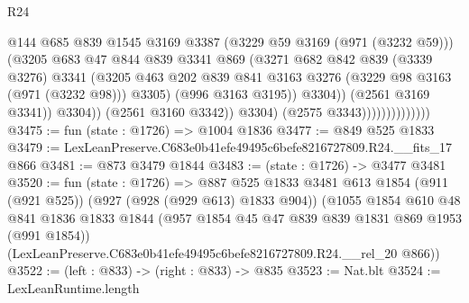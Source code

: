 \begin{lexlean}{R24}
\begin{coremodule}
                                          @144
                                          @685
                                          @839
                                          @1545
                                          @3169
                                          @3387
                                          (@3229 @59 @3169 (@971 (@3232 @59)))
                                          (@3205
                                            @683
                                            @47
                                            @844
                                            @839
                                            @3341
                                            @869
                                            (@3271
                                              @682
                                              @842
                                              @839
                                              (@3339 @3276)
                                              @3341
                                              (@3205
                                                @463
                                                @202
                                                @839
                                                @841
                                                @3163
                                                @3276
                                                (@3229 @98 @3163 (@971 (@3232 @98)))
                                                @3305)
                                              (@996 @3163 @3195))
                                            @3304))
                                        (@2561 @3169 @3341))
                                      @3304))
                                  (@2561 @3160 @3342))
                                @3304)
                              (@2575 @3343))))))))))))))
@3475 := fun (state : @1726) => @1004 @1836
@3477 := @849 @525 @1833
@3479 := LexLeanPreserve.C683e0b41efe49495c6befe8216727809.R24.__fits_17 @866
@3481 := @873 @3479 @1844
@3483 := (state : @1726) -> @3477 @3481
@3520 := fun (state : @1726) =>
  @887
    @525
    @1833
    @3481
    @613
    @1854
    (@911 (@921 @525))
    (@927 (@928 (@929 @613) @1833 @904))
    (@1055
      @1854
      @610
      @48
      @841
      @1836
      @1833
      @1844
      (@957 @1854 @45 @47 @839 @839 @1831 @869 @1953 (@991 @1854))
      (LexLeanPreserve.C683e0b41efe49495c6befe8216727809.R24.__rel_20 @866))
@3522 := (left : @833) -> (right : @833) -> @835
@3523 := Nat.blt
@3524 := LexLeanRuntime.length

\end{coremodule}
\end{lexlean}
